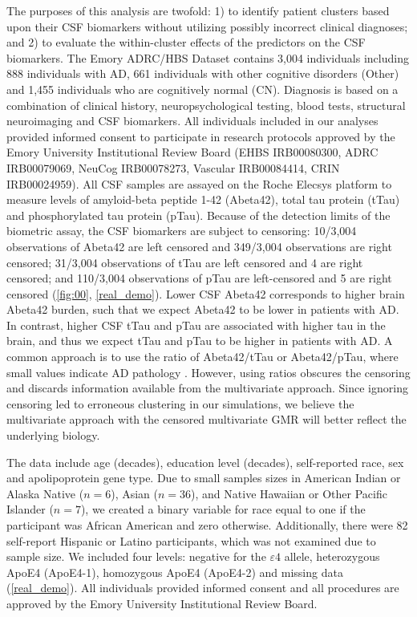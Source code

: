 \documentclass{interact}
\theoremstyle{plain}
\theoremstyle{definition}
\theoremstyle{remark}
\begin{document}
The purposes of this analysis are twofold: 1) to identify patient clusters based upon their CSF biomarkers without utilizing possibly incorrect clinical diagnoses; and 2) to evaluate the within-cluster effects of the predictors on the CSF biomarkers. The Emory ADRC/HBS Dataset contains 3,004 individuals including 888 individuals with AD, 661 individuals with other cognitive disorders (Other) and 1,455 individuals who are cognitively normal (CN). 
Diagnosis is based on a combination of clinical history, neuropsychological testing, blood tests, structural neuroimaging and CSF biomarkers. All individuals included in our analyses provided informed consent to participate in research protocols approved by the Emory University Institutional Review Board (EHBS IRB00080300,
ADRC IRB00079069, NeuCog IRB00078273, Vascular IRB00084414, CRIN IRB00024959). All CSF samples are assayed on the Roche Elecsys platform to measure levels of amyloid-beta peptide 1-42 (Abeta42), total tau protein (tTau) and phosphorylated tau protein (pTau). Because of the detection limits of the biometric assay, the CSF biomarkers are subject to censoring: 10/3,004 observations of Abeta42 are left censored and 349/3,004 observations are right censored; 31/3,004 observations of tTau are left censored and 4 are right censored; and 110/3,004 observations of pTau are left-censored and 5 are right censored (\cref{fig:00}, \cref{real_demo}). Lower CSF Abeta42 corresponds to higher brain Abeta42 burden, such that we expect Abeta42 to be lower in patients with AD. In contrast, higher CSF tTau and pTau are associated with higher tau in the brain, and thus we expect tTau and pTau to be higher in patients with AD. A common approach is to use the ratio of Abeta42/tTau or Abeta42/pTau, where small values indicate AD pathology \citep{Hampel2008, Meyer2010}. However, using ratios obscures the censoring and discards information available from the multivariate approach. Since ignoring censoring led to erroneous clustering in our simulations, we believe the multivariate approach with the censored multivariate GMR will better reflect the underlying biology. 


The data include age (decades), education level (decades), self-reported race, sex and apolipoprotein gene type. Due to small samples sizes in American Indian or Alaska Native ($n=6$), Asian ($n=36$), and Native Hawaiian or Other Pacific Islander ($n=7$), we created a binary variable for race equal to one if the participant was African American and zero otherwise. Additionally, there were 82 self-report Hispanic or Latino participants, which was not examined due to sample size. We included four levels: negative for the $\varepsilon4$ allele, heterozygous ApoE4 (ApoE4-1), homozygous ApoE4 (ApoE4-2) and missing data (\cref{real_demo}).  All individuals provided informed consent and all procedures are approved by the Emory University Institutional Review Board. 
\end{document}
